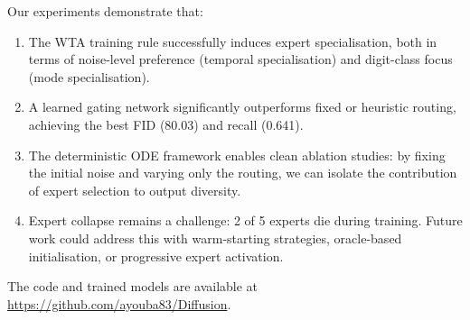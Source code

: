 \documentclass[11pt,a4paper]{article}
\begin{document}
Our experiments demonstrate that:
\begin{enumerate}[nosep]
  \item The WTA training rule successfully induces expert specialisation,
    both in terms of noise-level preference (temporal specialisation) and
    digit-class focus (mode specialisation).
  \item A learned gating network significantly outperforms fixed or
    heuristic routing, achieving the best FID (80.03) and recall (0.641).
  \item The deterministic ODE framework enables clean ablation studies: by
    fixing the initial noise and varying only the routing, we can isolate
    the contribution of expert selection to output diversity.
  \item Expert collapse remains a challenge: 2 of 5 experts die during
    training. Future work could address this with warm-starting strategies,
    oracle-based initialisation, or progressive expert activation.
\end{enumerate}

The code and trained models are available at
\url{https://github.com/ayouba83/Diffusion}.
\end{document}
